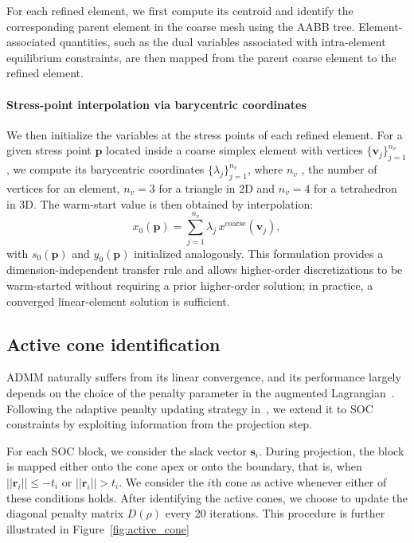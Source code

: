 For each refined element, we first compute its centroid and identify the corresponding parent element in the coarse mesh using the AABB tree. 
Element-associated quantities, such as the dual variables associated with intra-element equilibrium constraints, are then mapped from the parent coarse element to the refined element.


\paragraph{Stress-point interpolation via barycentric coordinates}

We then initialize the variables at the stress points of each refined element. 
For a given stress point $\mathbf{p}$ located inside a coarse simplex element with vertices $\{\mathbf{v}_j\}_{j=1}^{n_v}$, we compute its barycentric coordinates $\{\lambda_j\}_{j=1}^{n_v}$, where $n_v$ , the number of vertices for an element, $n_v=3$ for a triangle in 2D and $n_v=4$ for a tetrahedron in 3D. 
The warm-start value is then obtained by interpolation:
\begin{equation}
x_0(\mathbf{p}) = \sum_{j=1}^{n_v} \lambda_j \,
x^{\mathrm{coarse}}(\mathbf{v}_j),
\label{eq:interpolation_x}
\end{equation}
with $s_0(\mathbf{p})$ and $y_0(\mathbf{p})$ initialized analogously. 
This formulation provides a dimension-independent transfer rule and allows higher-order discretizations to be warm-started without requiring a prior higher-order solution; in practice, a converged linear-element solution is sufficient.

\subsection{Active cone identification}

ADMM naturally suffers from its linear convergence, and its performance largely depends on the choice of the penalty parameter in the augmented Lagrangian~\cite{SuperADMM}. Following the adaptive penalty updating strategy in~\cite{SuperADMM}, we extend it to SOC constraints by exploiting information from the projection step.

For each SOC block, we consider the slack vector $\boldsymbol{s}_i$. During projection, the block is mapped either onto the cone apex or onto the boundary, that is, when $|| \boldsymbol{r}_i || \le -t_i$  or $ || \boldsymbol{r}_i || > t_i$. We consider the $i$th cone as active whenever either of these conditions holds. After identifying the active cones, we choose to update the diagonal penalty matrix $D(\rho)$ every 20 iterations. This procedure is further illustrated in Figure~\ref{fig:active_cone}

